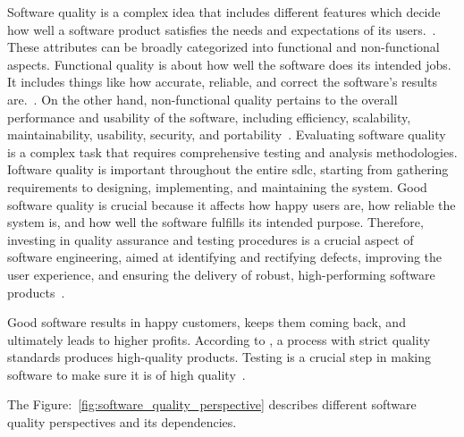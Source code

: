 Software quality is a complex idea that includes different features which decide
how well a software product satisfies the needs and expectations of its users.~\cite{boehm1976quantitative}.
These attributes can be broadly categorized into functional and non-functional aspects.
Functional quality is about how well the software does its intended jobs. It
includes things like how accurate, reliable, and correct the software's results
are.~\cite{kiruthika2015software}. On the other hand,
non-functional quality pertains to the overall performance and usability of the software,
including efficiency, scalability, maintainability, usability, security, and portability~\cite{chung2012non}.
Evaluating software quality is a complex task that requires comprehensive testing and analysis
methodologies. Ioftware quality is important throughout the entire \acrshort{sdlc},
starting from gathering requirements to designing,
implementing, and maintaining the system. Good software quality is crucial
because it affects how happy users are, how reliable the system is, and how well
the software fulfills its intended purpose. Therefore, investing in quality assurance and testing
procedures is a crucial aspect of software engineering, aimed at identifying and rectifying defects,
improving the user experience, and ensuring the delivery of robust, high-performing software
products~\cite{cavano1978framework}.

Good software results in happy customers, keeps them coming back, and ultimately
leads to higher profits. According to \citeauthor{8748529}, a process with
strict quality standards produces high-quality products. Testing is a crucial
step in making software to make sure it is of high quality~\cite{8748529}.

The Figure:~\ref{fig:software_quality_perspective} describes different software quality perspectives
and its dependencies.

